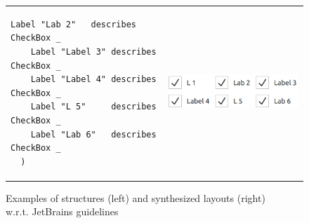 \begin{figure}
\begin{tabular}{m{95mm}m{5cm}}
\begin{lstlisting}[basicstyle=\small]
    Label "Lab 2"   describes CheckBox _
    Label "Label 3" describes CheckBox _
    Label "Label 4" describes CheckBox _
    Label "L 5"     describes CheckBox _
    Label "Lab 6"   describes CheckBox _
  )
      \end{lstlisting} &
      \includegraphics[scale=0.5]{Example5-Qt-QML.png} \\
    \end{tabular}
    \caption{Examples of structures (left) and synthesized layouts (right)\\
      w.r.t. JetBrains guidelines}
    \label{fig:evaluation}
  \end{figure}
